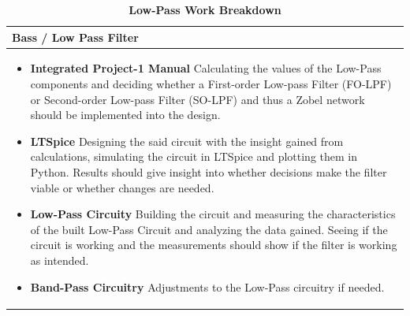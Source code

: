 \begin{table}[h!]
\captionsetup{justification=centering, labelfont=bf}
\caption{\textbf{Low-Pass Work Breakdown}}
\begin{tabular*}{\textwidth}{@{\extracolsep{\fill}} p{} @{}} 
\toprule
     \textbf{Bass / Low Pass Filter} \\
     \midrule
    \begin{itemize}
        \item \textbf{Integrated Project-1 Manual} \newline Calculating the values of the Low-Pass components and deciding whether a First-order Low-pass Filter (FO-LPF) or Second-order Low-pass Filter (SO-LPF) and thus a Zobel network should be implemented into the design.
        \item \textbf{LTSpice} \newline Designing the said circuit with the insight gained from calculations, simulating the circuit in LTSpice and plotting them in Python. Results should give insight into whether decisions make the filter viable or whether changes are needed.
        \item \textbf{Low-Pass Circuity} \newline Building the circuit and measuring the characteristics of the built Low-Pass Circuit and analyzing the data gained. Seeing if the circuit is working and the measurements should show if the filter is working as intended.
        \item \textbf{Band-Pass Circuitry} \newline Adjustments to the Low-Pass circuitry if needed.
    \end{itemize} \\
     \bottomrule
\end{tabular*}

\label{tab:LP Work Breakdown}
\end{table}

